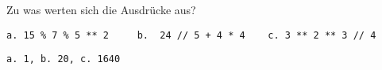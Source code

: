 \question[3]
Zu was werten sich die Ausdrücke aus?
\begin{lstlisting}
a. 15 % 7 % 5 ** 2     b.  24 // 5 + 4 * 4    c. 3 ** 2 ** 3 // 4
\end{lstlisting}
\begin{solutionbox}{2cm}
\begin{lstlisting}
a. 1, b. 20, c. 1640
\end{lstlisting}
\end{solutionbox}
